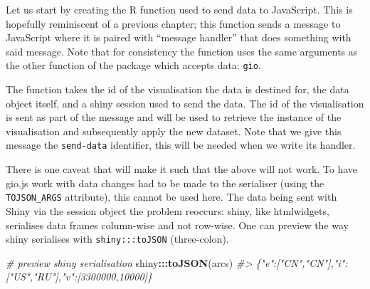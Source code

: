 \documentclass[10pt,]{krantz}
\makeatletter
\newenvironment{Shaded}{\begin{snugshade}}{\end{snugshade}}
\newcommand{\CommentTok}[1]{\textcolor[rgb]{0.37,0.37,0.37}{\textit{#1}}}
\newcommand{\ControlFlowTok}[1]{\textcolor[rgb]{0.27,0.27,0.27}{\textbf{#1}}}
\newcommand{\DataTypeTok}[1]{\textcolor[rgb]{0.27,0.27,0.27}{#1}}
\newcommand{\KeywordTok}[1]{\textcolor[rgb]{0.27,0.27,0.27}{\textbf{#1}}}
\newcommand{\NormalTok}[1]{#1}
\newcommand{\OperatorTok}[1]{\textcolor[rgb]{0.43,0.43,0.43}{\textbf{#1}}}
\newcommand{\StringTok}[1]{\textcolor[rgb]{0.5,0.5,0.5}{#1}}
\newenvironment{kframe}{%
\medskip{}
\setlength{\fboxsep}{.8em}
 \def\at@end@of@kframe{}%
 \ifinner\ifhmode%
  \def\at@end@of@kframe{\end{minipage}}%
  \begin{minipage}{\columnwidth}%
 \fi\fi%
 \def\FrameCommand##1{\hskip\@totalleftmargin \hskip-\fboxsep
 \colorbox{shadecolor}{##1}\hskip-\fboxsep
     \hskip-\linewidth \hskip-\@totalleftmargin \hskip\columnwidth}%
 \MakeFramed {\advance\hsize-\width
   \@totalleftmargin\z@ \linewidth\hsize
   \@setminipage}}%
 {\par\unskip\endMakeFramed%
 \at@end@of@kframe}
\renewenvironment{Shaded}{\begin{kframe}}{\end{kframe}}
\makeatother
\begin{document}
Let us start by creating the R function used to send data to JavaScript. This is hopefully reminiscent of a previous chapter; this function sends a message to JavaScript where it is paired with ``message handler'' that does something with said message. Note that for consistency the function uses the same arguments as the other function of the package which accepts data: \texttt{gio}.

\begin{Shaded}
\end{Shaded}

The function takes the id of the visualisation the data is destined for, the data object itself, and a shiny session used to send the data. The id of the visualisation is sent as part of the message and will be used to retrieve the instance of the visualisation and subsequently apply the new dataset. Note that we give this message the \texttt{send-data} identifier, this will be needed when we write its handler.

There is one caveat that will make it such that the above will not work. To have gio.js work with data changes had to be made to the serialiser (using the \texttt{TOJSON\_ARGS} attribute), this cannot be used here. The data being sent with Shiny via the session object the problem reoccurs: shiny, like htmlwidgets, serialises data frames column-wise and not row-wise. One can preview the way shiny serialises with \texttt{shiny:::toJSON} (three-colon).

\begin{Shaded}
\begin{Highlighting}[]
\CommentTok{# preview shiny serialisation}
\NormalTok{shiny}\OperatorTok{:::}\KeywordTok{toJSON}\NormalTok{(arcs)}
\CommentTok{#> \{"e":["CN","CN"],"i":["US","RU"],"v":[3300000,10000]\}}
\end{Highlighting}
\end{Shaded}
\end{document}
